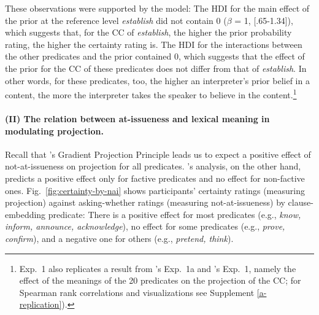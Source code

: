 \documentclass[11pt,fleqn]{article}
\newcommand{\6}{\mbox{$[\hspace*{-.6mm}[$}}
\newcommand{\9}{\mbox{$]\hspace*{-.6mm}]$}}
\newcommand{\citepos}[1]{\citeauthor{#1}'s \citeyear{#1}}
\begin{document}
These observations were supported by the model: The HDI for the main effect of the prior at the reference level {\em establish} did not contain 0 ($\beta$ = 1, [.65-1.34]), which suggests that, for the CC of {\em establish}, the higher the prior probability rating, the higher the certainty rating is. The HDI for the interactions between the other predicates and the prior contained 0, which suggests that the effect of the prior for the CC of these predicates does not differ from that of {\em establish}. In other words, for these predicates, too, the higher an interpreter's prior belief in a content, the more the interpreter takes the speaker to believe in the content.\footnote{Exp.~1 also replicates a result from \citepos{degen-tonhauser-language} Exp.~1a and \citepos{degen-tonhauser-openmind} Exp.~1, namely the effect of the meanings of the 20 predicates on the projection of the CC; for Spearman rank correlations and visualizations see Supplement \ref{a-replication}).} 
                          
\paragraph{(II) The relation between at-issueness and lexical meaning in modulating projection.} Recall that \citepos{tbd-variability} Gradient Projection Principle leads us to expect a positive effect of not-at-issueness on projection for all predicates. \citepos{djaerv-bacovcin2020} analysis, on the other hand, predicts a positive effect only for factive predicates and no effect for non-factive ones. Fig.~\ref{fig:certainty-by-nai} shows participants' certainty ratings (measuring projection) against asking-whether ratings (measuring not-at-issueness) by clause-embedding predicate: There is a positive effect for most predicates (e.g., {\em know, inform, announce, acknowledge}), no effect for some predicates (e.g., {\em prove, confirm}), and a negative one for others (e.g., {\em pretend, think}). 
\end{document}
